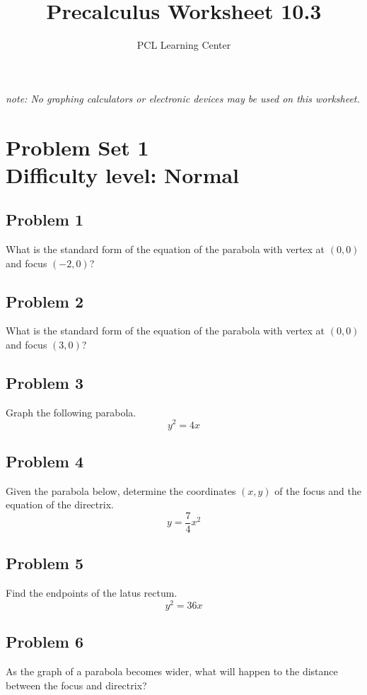 \documentclass[12pt]{article}
\title{Precalculus Worksheet 10.3}
\author{PCL Learning Center}
\date{}
\begin{document}
\maketitle

\begin{center}
    \textit{note: No graphing calculators or electronic devices may be used on this worksheet.}    
\end{center}

\section*{Problem Set 1\\Difficulty level: Normal}
\subsection*{Problem 1}
What is the standard form of the equation of the parabola with vertex at \((0,0)\) and focus \((-2,0)\)?

\subsection*{Problem 2}
What is the standard form of the equation of the parabola with vertex at \((0,0)\) and focus \((3,0)\)?

\subsection*{Problem 3}
Graph the following parabola.
\[y^2=4x\]

\subsection*{Problem 4}
Given the parabola below, determine the coordinates \((x,y)\) of the focus and the equation of the directrix.
\[y=\dfrac{7}{4}x^2\]

\subsection*{Problem 5}
Find the endpoints of the latus rectum.
\[y^2=36x\]

\subsection*{Problem 6}
As the graph of a parabola becomes wider, what will happen to the distance between the focus and directrix?
\end{document}
